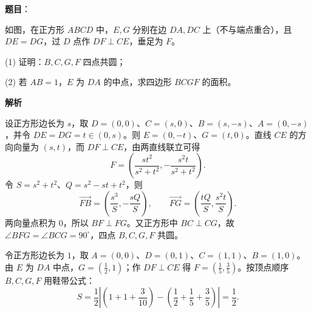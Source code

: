 \begin{answer}

\textbf{题目}：

如图，在正方形 $ABCD$ 中，$E,G$ 分别在边 $DA,DC$ 上（不与端点重合），且 $DE=DG$，过 $D$ 点作 $DF\perp CE$，垂足为 $F$。
\nopagebreak[4]
\begin{center}\end{center}
\nopagebreak[4]
   (1) 证明：$B,C,G,F$ 四点共圆；

   (2) 若 $AB=1$，$E$ 为 $DA$ 的中点，求四边形 $BCGF$ 的面积。

\textbf{解析}


设正方形边长为 $s$，取 $D=(0,0)$、$C=(s,0)$、$B=(s,-s)$、$A=(0,-s)$，并令 $DE=DG=t\in(0,s)$。则 $E=(0,-t)$、$G=(t,0)$。直线 $CE$ 的方向向量为 $(s,t)$，而 $DF\perp CE$，由两直线联立可得
\nopagebreak[4]
\[
F=\left(\frac{st^2}{s^2+t^2},-\frac{s^2t}{s^2+t^2}\right).
\]
令 $S=s^2+t^2$、$Q=s^2-st+t^2$，则
\nopagebreak[4]
\[
\overrightarrow{FB}=\left(\frac{s^3}{S},-\frac{sQ}{S}\right),\qquad
\overrightarrow{FG}=\left(\frac{tQ}{S},\frac{s^2t}{S}\right).
\]
两向量点积为 $0$，所以 $BF\perp FG$。又正方形中 $BC\perp CG$，故 $\angle BFG=\angle BCG=90^\circ$，四点 $B,C,G,F$ 共圆。


令正方形边长为 $1$，取 $A=(0,0)$、$D=(0,1)$、$C=(1,1)$、$B=(1,0)$。由 $E$ 为 $DA$ 中点，$G=(\frac12,1)$；作 $DF\perp CE$ 得 $F=(\frac15,\frac35)$。按顶点顺序 $B,C,G,F$ 用鞋带公式：
\nopagebreak[4]
\[
S=\frac12\left|\left(1+1+\frac3{10}\right)
-\left(\frac12+\frac15+\frac35\right)\right|=\frac12.
\]



\end{answer}
